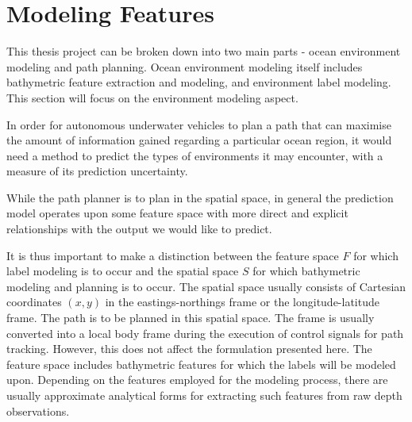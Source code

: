 %		
%				
			
	\section{Modeling Features}
	\label{ModelingOceanEnvironment:ModelingFeatures}
	
		This thesis project can be broken down into two main parts - ocean environment modeling and path planning. Ocean environment modeling itself includes bathymetric feature extraction and modeling, and environment label modeling. This section will focus on the environment modeling aspect.
			
		In order for autonomous underwater vehicles to plan a path that can maximise the amount of information gained regarding a particular ocean region, it would need a method to predict the types of environments it may encounter, with a measure of its prediction uncertainty.
		
		While the path planner is to plan in the spatial space, in general the prediction model operates upon some feature space with more direct and explicit relationships with the output we would like to predict.
		
		It is thus important to make a distinction between the feature space $F$ for which label modeling is to occur and the spatial space $S$ for which bathymetric modeling and planning is to occur. The spatial space usually consists of Cartesian coordinates $(x, y)$ in the eastings-northings frame or the longitude-latitude frame. The path is to be planned in this spatial space. The frame is usually converted into a local body frame during the execution of control signals for path tracking. However, this does not affect the formulation presented here. The feature space includes bathymetric features for which the labels will be modeled upon. Depending on the features employed for the modeling process, there are usually approximate analytical forms for extracting such features from raw depth observations.

